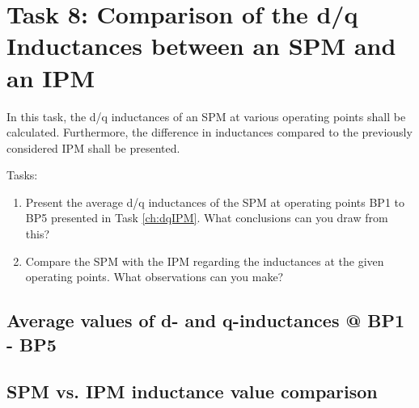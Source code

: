 %
%

\chapter{Task 8: Comparison of the d/q Inductances between an SPM and an IPM}

In this task, the d/q inductances of an \gls{SPM} at various operating points shall be calculated. Furthermore, the difference in inductances compared to the previously considered IPM shall be presented.

\bigskip

Tasks:
\begin{enumerate}
\item Present the average d/q inductances of the \gls{SPM} at operating points BP1 to BP5 presented in Task \ref{ch:dqIPM}. What conclusions can you draw from this?
\item Compare the \gls{SPM} with the \gls{IPM} regarding the inductances at the given operating points. What observations can you make?
\end{enumerate}

\newpage

\section{Average values of d- and q-inductances @ BP1 - BP5}

\section{SPM vs. IPM inductance value comparison}
